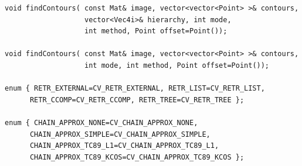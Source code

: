 \begin{lstlisting}
void findContours( const Mat& image, vector<vector<Point> >& contours,
                   vector<Vec4i>& hierarchy, int mode,
                   int method, Point offset=Point());

void findContours( const Mat& image, vector<vector<Point> >& contours,
                   int mode, int method, Point offset=Point());

enum { RETR_EXTERNAL=CV_RETR_EXTERNAL, RETR_LIST=CV_RETR_LIST,
      RETR_CCOMP=CV_RETR_CCOMP, RETR_TREE=CV_RETR_TREE };

enum { CHAIN_APPROX_NONE=CV_CHAIN_APPROX_NONE,
      CHAIN_APPROX_SIMPLE=CV_CHAIN_APPROX_SIMPLE,
      CHAIN_APPROX_TC89_L1=CV_CHAIN_APPROX_TC89_L1,
      CHAIN_APPROX_TC89_KCOS=CV_CHAIN_APPROX_TC89_KCOS };
\end{lstlisting}
